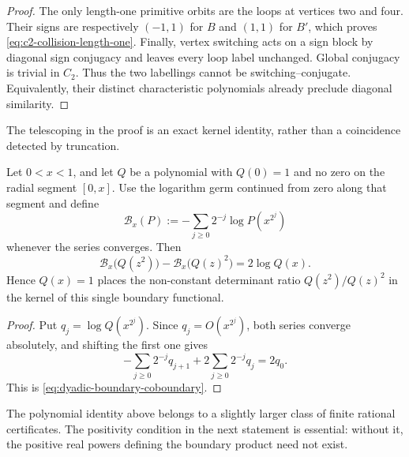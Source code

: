 \begin{proof}
The only length-one primitive orbits are the loops at vertices two and four.
Their signs are respectively \((-1,1)\) for \(B\) and \((1,1)\) for \(B'\),
which proves \eqref{eq:c2-collision-length-one}.  Finally, vertex switching
acts on a sign block by diagonal sign conjugacy and leaves every loop label
unchanged.  Global conjugacy is trivial in \(C_2\).  Thus the two labellings
cannot be switching--conjugate.  Equivalently, their distinct characteristic
polynomials already preclude diagonal similarity.
\end{proof}

The telescoping in the proof is an exact kernel identity, rather than a
coincidence detected by truncation.

\begin{proposition}
\label{prop:dyadic-boundary-functional}
Let \(0<x<1\), and let \(Q\) be a polynomial with \(Q(0)=1\) and no zero on
the radial segment \([0,x]\).  Use the logarithm germ continued from zero
along that segment and define
\[
 \mathscr B_x(P):=-\sum_{j\ge0}2^{-j}\log P(x^{2^j})
\]
whenever the series converges.  Then
\begin{equation}\label{eq:dyadic-boundary-coboundary}
 \mathscr B_x\bigl(Q(z^2)\bigr)
 -\mathscr B_x\bigl(Q(z)^2\bigr)=2\log Q(x).
\end{equation}
Hence \(Q(x)=1\) places the non-constant determinant ratio
\(Q(z^2)/Q(z)^2\) in the kernel of this single boundary functional.
\end{proposition}

\begin{proof}
Put \(q_j=\log Q(x^{2^j})\).  Since \(q_j=O(x^{2^j})\), both series converge
absolutely, and shifting the first one gives
\[
 -\sum_{j\ge0}2^{-j}q_{j+1}
 +2\sum_{j\ge0}2^{-j}q_j=2q_0.
\]
This is \eqref{eq:dyadic-boundary-coboundary}.
\end{proof}

The polynomial identity above belongs to a slightly larger class of finite
rational certificates.  The positivity condition in the next statement is
essential: without it, the positive real powers defining the boundary product
need not exist.

